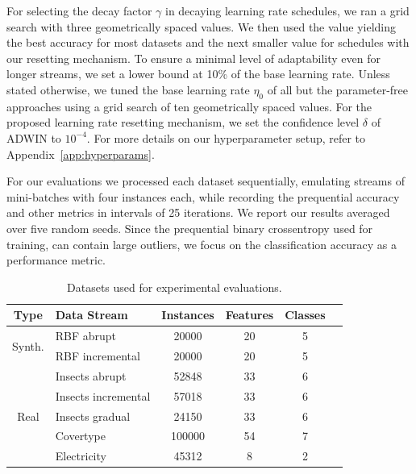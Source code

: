 \documentclass[letterpaper]{article} %
\begin{document}
For selecting the decay factor $\gamma$ in decaying learning rate schedules, we ran a grid search with three geometrically spaced values.
We then used the value yielding the best accuracy for most datasets and the next smaller value for schedules with our resetting mechanism.
To ensure a minimal level of adaptability even for longer streams, we set a lower bound at 10\% of the base learning rate.
Unless stated otherwise, we tuned the base learning rate $\eta_0$ of all but the parameter-free approaches using a grid search of ten geometrically spaced values.
For the proposed learning rate resetting mechanism, we set the confidence level $\delta$ of ADWIN to $10^{-4}$.
For more details on our hyperparameter setup, refer to Appendix~\ref{app:hyperparams}.

For our evaluations we processed each dataset sequentially, emulating streams of mini-batches with four instances each, while recording the prequential accuracy and other metrics in intervals of 25 iterations.
We report our results averaged over five random seeds.
Since the prequential binary crossentropy used for training, can contain large outliers, we focus on the classification accuracy as a performance metric.



\begin{table}[]
	\small
	\begin{tabular}{@{}clcccc@{}}
		\toprule
		Type                    & Data Stream            & Instances & Features & Classes \\
		\midrule
		\multirow{2}{*}{Synth.} & RBF abrupt             & 20000     & 20       & 5       \\
		                        & RBF incremental        & 20000     & 20       & 5       \\
		\midrule
		\multirow{5}{*}{Real}   & Insects abrupt         & 52848     & 33       & 6       \\
		                        & Insects incremental    & 57018     & 33       & 6       \\
		                        & Insects gradual        & 24150     & 33       & 6       \\
		                        & Covertype\footnotemark & 100000    & 54       & 7       \\
		                        & Electricity            & 45312     & 8        & 2       \\
		\bottomrule
	\end{tabular}
	\caption{Datasets used for experimental evaluations.}
	\label{tab:datasets}
\end{table}
\end{document}
